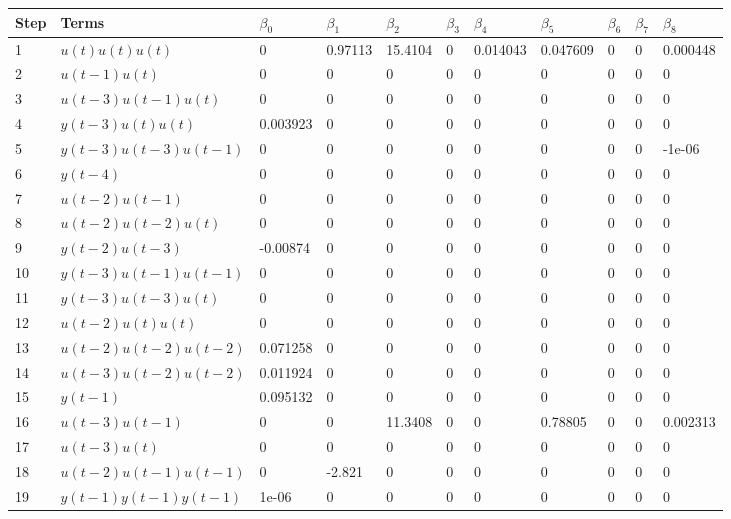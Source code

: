 \begin{tabular}{lllllllllll}
Step & Terms & $\beta_{0}$ & $\beta_{1}$ & $\beta_{2}$ & $\beta_{3}$ & $\beta_{4}$ & $\beta_{5}$ & $\beta_{6}$ & $\beta_{7}$ & $\beta_{8}$ \\ 
\hline 
1 & $u(t)u(t)u(t)$ & 0 & 0.97113 & 15.4104 & 0 & 0.014043 & 0.047609 & 0 & 0 & 0.000448 \\ 
2 & $u(t-1)u(t)$ & 0 & 0 & 0 & 0 & 0 & 0 & 0 & 0 & 0 \\ 
3 & $u(t-3)u(t-1)u(t)$ & 0 & 0 & 0 & 0 & 0 & 0 & 0 & 0 & 0 \\ 
4 & $y(t-3)u(t)u(t)$ & 0.003923 & 0 & 0 & 0 & 0 & 0 & 0 & 0 & 0 \\ 
5 & $y(t-3)u(t-3)u(t-1)$ & 0 & 0 & 0 & 0 & 0 & 0 & 0 & 0 & -1e-06 \\ 
6 & $y(t-4)$ & 0 & 0 & 0 & 0 & 0 & 0 & 0 & 0 & 0 \\ 
7 & $u(t-2)u(t-1)$ & 0 & 0 & 0 & 0 & 0 & 0 & 0 & 0 & 0 \\ 
8 & $u(t-2)u(t-2)u(t)$ & 0 & 0 & 0 & 0 & 0 & 0 & 0 & 0 & 0 \\ 
9 & $y(t-2)u(t-3)$ & -0.00874 & 0 & 0 & 0 & 0 & 0 & 0 & 0 & 0 \\ 
10 & $y(t-3)u(t-1)u(t-1)$ & 0 & 0 & 0 & 0 & 0 & 0 & 0 & 0 & 0 \\ 
11 & $y(t-3)u(t-3)u(t)$ & 0 & 0 & 0 & 0 & 0 & 0 & 0 & 0 & 0 \\ 
12 & $u(t-2)u(t)u(t)$ & 0 & 0 & 0 & 0 & 0 & 0 & 0 & 0 & 0 \\ 
13 & $u(t-2)u(t-2)u(t-2)$ & 0.071258 & 0 & 0 & 0 & 0 & 0 & 0 & 0 & 0 \\ 
14 & $u(t-3)u(t-2)u(t-2)$ & 0.011924 & 0 & 0 & 0 & 0 & 0 & 0 & 0 & 0 \\ 
15 & $y(t-1)$ & 0.095132 & 0 & 0 & 0 & 0 & 0 & 0 & 0 & 0 \\ 
16 & $u(t-3)u(t-1)$ & 0 & 0 & 11.3408 & 0 & 0 & 0.78805 & 0 & 0 & 0.002313 \\ 
17 & $u(t-3)u(t)$ & 0 & 0 & 0 & 0 & 0 & 0 & 0 & 0 & 0 \\ 
18 & $u(t-2)u(t-1)u(t-1)$ & 0 & -2.821 & 0 & 0 & 0 & 0 & 0 & 0 & 0 \\ 
19 & $y(t-1)y(t-1)y(t-1)$ & 1e-06 & 0 & 0 & 0 & 0 & 0 & 0 & 0 & 0 \\ 
\hline 
\end{tabular}